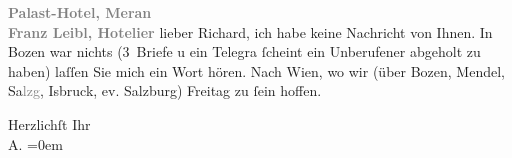 \pstart
           \raggedleft{}\textcolor{gray}{\textbf{Palast-Hotel, Meran}}{\\}\textcolor{gray}{\textbf{Franz Leibl, Hotelier}}\pend
           \vspace{1em}
\pstart
           \noindent{}{\pb}lieber Richard, ich habe keine Nachricht von Ihnen. In Bozen war nichts (3 Briefe u ein Telegra{\geminationm}{ }ſcheint ein Unberufener abgeholt zu haben) laſſen Sie
               mich ein Wort hören. Nach Wien, wo wir (über Bozen, Mendel, Sa\textcolor{gray}{lzg}, I{\geminationn}sbruck, ev. Salzburg) Freitag zu{ }ſein hoffen.\pend
           
\pstart
           Herzlichſt Ihr{\\[\baselineskip]}\spacefill\mbox{A.}\pend
           \leftskip=0em{}\endnumbering{}  \newcommand{\dateiname}{L01706}\newcommand{\titel}{Arthur Schnitzler an Richard Beer-Hofmann, 9. 9. 1907}\newcommand{\editorInnen}{Martin Anton Müller und Gerd-Hermann Susen}
